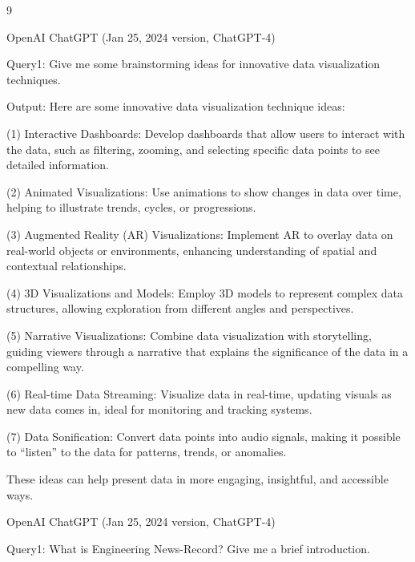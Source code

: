 \documentclass{mcmthesis}
\begin{document}
\AImatter

\begin{ReportAiUse}{9}

OpenAI ChatGPT \cite{chatgpt2024} (Jan 25, 2024 version, ChatGPT-4) 

Query1: Give me some brainstorming ideas for innovative data visualization techniques.

Output: Here are some innovative data visualization technique ideas:

(1) Interactive Dashboards: Develop dashboards that allow users to interact with the data,
such as filtering, zooming, and selecting specific data points to see detailed information.

(2) Animated Visualizations: Use animations to show changes in data over time, helping
to illustrate trends, cycles, or progressions.

(3) Augmented Reality (AR) Visualizations: Implement AR to overlay data on real-world
objects or environments, enhancing understanding of spatial and contextual relationships.

(4) 3D Visualizations and Models: Employ 3D models to represent complex data structures,
allowing exploration from different angles and perspectives.

(5) Narrative Visualizations: Combine data visualization with storytelling, guiding viewers
through a narrative that explains the significance of the data in a compelling way.

(6) Real-time Data Streaming: Visualize data in real-time, updating visuals as new data
comes in, ideal for monitoring and tracking systems.

(7) Data Sonification: Convert data points into audio signals, making it possible to ``listen''
to the data for patterns, trends, or anomalies.

These ideas can help present data in more engaging, insightful, and accessible ways.

OpenAI ChatGPT (Jan 25, 2024 version, ChatGPT-4)

Query1: What is Engineering News-Record? Give me a brief introduction.


\end{ReportAiUse}
\end{document}
